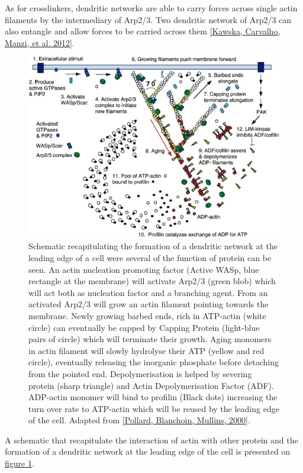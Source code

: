 \documentclass[A4paperpaper,11pt,english]{sphinxmanual}
\begin{document}
As for crosslinkers, dendritic networks are able to carry forces across single
actin filaments by the intermediary of Arp2/3. Two dendritic network of Arp2/3
can also entangle and allow forces to be carried across them
{\hyperref[index-latex:kawska2012]{{[}Kawska, Carvalho, Manzi,  et al.  2012{]}}}.
\begin{figure}[htbp]
\centering
\capstart

\includegraphics[width=0.700\linewidth]{pollard2003-actin-cycle.jpg}
\caption{Schematic recapitulating the formation of
a dendritic network at the leading edge of a cell were several of the
function of protein can be seen. An actin nucleation promoting factor
(Active WASp,  blue rectangle at the membrane) will activate Arp2/3 (green
blob) which will act both as nucleation factor and a branching agent. From
an activated Arp2/3 will grow an actin filament pointing towards the
membrane. Newly growing barbed ends, rich in ATP-actin (white circle) can
eventually be capped by Capping Protein (light-blue pairs of circle) which
will terminate their growth.  Aging monomers in actin filament will slowly
hydrolyse their ATP (yellow and red circle), eventually releasing the
inorganic phosphate before detaching from the pointed end.
Depolymerisation is helped by severing protein (sharp triangle) and Actin
Depolymerisation Factor (ADF). ADP-actin monomer will bind to profilin
(Black dots) increasing the turn over rate to ATP-actin which will be reused
by the leading edge of the cell. Adapted from {\hyperref[index-latex:pollard2000]{{[}Pollard, Blanchoin, Mullins,  2000{]}}}.}\label{index-latex:actin-cycle}\end{figure}

A schematic that recapitulate the interaction of actin with other protein and
the formation of a dendritic network at the leading edge of the cell is
presented on \hyperref[index-latex:actin-cycle]{figure  \ref*{index-latex:actin-cycle}}.
\end{document}
